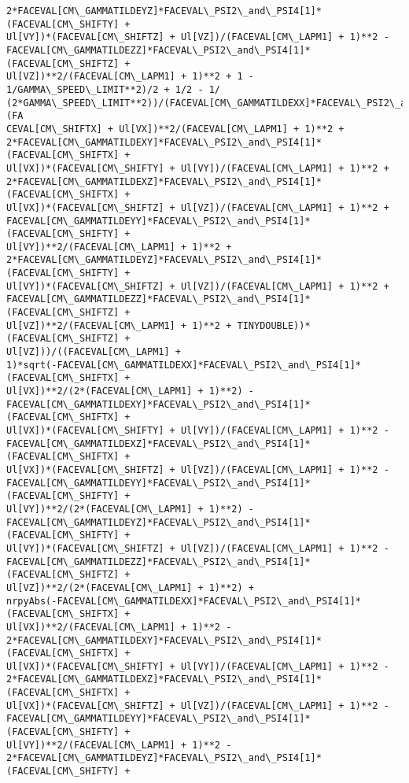 \documentclass[landscape,letterpaper,10pt,english]{article}
\begin{document}
\begin{Verbatim}[commandchars=\\\{\}]
2*FACEVAL[CM\_GAMMATILDEYZ]*FACEVAL\_PSI2\_and\_PSI4[1]*(FACEVAL[CM\_SHIFTY] +
Ul[VY])*(FACEVAL[CM\_SHIFTZ] + Ul[VZ])/(FACEVAL[CM\_LAPM1] + 1)**2 -
FACEVAL[CM\_GAMMATILDEZZ]*FACEVAL\_PSI2\_and\_PSI4[1]*(FACEVAL[CM\_SHIFTZ] +
Ul[VZ])**2/(FACEVAL[CM\_LAPM1] + 1)**2 + 1 - 1/GAMMA\_SPEED\_LIMIT**2)/2 + 1/2 - 1/
(2*GAMMA\_SPEED\_LIMIT**2))/(FACEVAL[CM\_GAMMATILDEXX]*FACEVAL\_PSI2\_and\_PSI4[1]*(FA
CEVAL[CM\_SHIFTX] + Ul[VX])**2/(FACEVAL[CM\_LAPM1] + 1)**2 +
2*FACEVAL[CM\_GAMMATILDEXY]*FACEVAL\_PSI2\_and\_PSI4[1]*(FACEVAL[CM\_SHIFTX] +
Ul[VX])*(FACEVAL[CM\_SHIFTY] + Ul[VY])/(FACEVAL[CM\_LAPM1] + 1)**2 +
2*FACEVAL[CM\_GAMMATILDEXZ]*FACEVAL\_PSI2\_and\_PSI4[1]*(FACEVAL[CM\_SHIFTX] +
Ul[VX])*(FACEVAL[CM\_SHIFTZ] + Ul[VZ])/(FACEVAL[CM\_LAPM1] + 1)**2 +
FACEVAL[CM\_GAMMATILDEYY]*FACEVAL\_PSI2\_and\_PSI4[1]*(FACEVAL[CM\_SHIFTY] +
Ul[VY])**2/(FACEVAL[CM\_LAPM1] + 1)**2 +
2*FACEVAL[CM\_GAMMATILDEYZ]*FACEVAL\_PSI2\_and\_PSI4[1]*(FACEVAL[CM\_SHIFTY] +
Ul[VY])*(FACEVAL[CM\_SHIFTZ] + Ul[VZ])/(FACEVAL[CM\_LAPM1] + 1)**2 +
FACEVAL[CM\_GAMMATILDEZZ]*FACEVAL\_PSI2\_and\_PSI4[1]*(FACEVAL[CM\_SHIFTZ] +
Ul[VZ])**2/(FACEVAL[CM\_LAPM1] + 1)**2 + TINYDOUBLE))*(FACEVAL[CM\_SHIFTZ] +
Ul[VZ]))/((FACEVAL[CM\_LAPM1] +
1)*sqrt(-FACEVAL[CM\_GAMMATILDEXX]*FACEVAL\_PSI2\_and\_PSI4[1]*(FACEVAL[CM\_SHIFTX] +
Ul[VX])**2/(2*(FACEVAL[CM\_LAPM1] + 1)**2) -
FACEVAL[CM\_GAMMATILDEXY]*FACEVAL\_PSI2\_and\_PSI4[1]*(FACEVAL[CM\_SHIFTX] +
Ul[VX])*(FACEVAL[CM\_SHIFTY] + Ul[VY])/(FACEVAL[CM\_LAPM1] + 1)**2 -
FACEVAL[CM\_GAMMATILDEXZ]*FACEVAL\_PSI2\_and\_PSI4[1]*(FACEVAL[CM\_SHIFTX] +
Ul[VX])*(FACEVAL[CM\_SHIFTZ] + Ul[VZ])/(FACEVAL[CM\_LAPM1] + 1)**2 -
FACEVAL[CM\_GAMMATILDEYY]*FACEVAL\_PSI2\_and\_PSI4[1]*(FACEVAL[CM\_SHIFTY] +
Ul[VY])**2/(2*(FACEVAL[CM\_LAPM1] + 1)**2) -
FACEVAL[CM\_GAMMATILDEYZ]*FACEVAL\_PSI2\_and\_PSI4[1]*(FACEVAL[CM\_SHIFTY] +
Ul[VY])*(FACEVAL[CM\_SHIFTZ] + Ul[VZ])/(FACEVAL[CM\_LAPM1] + 1)**2 -
FACEVAL[CM\_GAMMATILDEZZ]*FACEVAL\_PSI2\_and\_PSI4[1]*(FACEVAL[CM\_SHIFTZ] +
Ul[VZ])**2/(2*(FACEVAL[CM\_LAPM1] + 1)**2) +
nrpyAbs(-FACEVAL[CM\_GAMMATILDEXX]*FACEVAL\_PSI2\_and\_PSI4[1]*(FACEVAL[CM\_SHIFTX] +
Ul[VX])**2/(FACEVAL[CM\_LAPM1] + 1)**2 -
2*FACEVAL[CM\_GAMMATILDEXY]*FACEVAL\_PSI2\_and\_PSI4[1]*(FACEVAL[CM\_SHIFTX] +
Ul[VX])*(FACEVAL[CM\_SHIFTY] + Ul[VY])/(FACEVAL[CM\_LAPM1] + 1)**2 -
2*FACEVAL[CM\_GAMMATILDEXZ]*FACEVAL\_PSI2\_and\_PSI4[1]*(FACEVAL[CM\_SHIFTX] +
Ul[VX])*(FACEVAL[CM\_SHIFTZ] + Ul[VZ])/(FACEVAL[CM\_LAPM1] + 1)**2 -
FACEVAL[CM\_GAMMATILDEYY]*FACEVAL\_PSI2\_and\_PSI4[1]*(FACEVAL[CM\_SHIFTY] +
Ul[VY])**2/(FACEVAL[CM\_LAPM1] + 1)**2 -
2*FACEVAL[CM\_GAMMATILDEYZ]*FACEVAL\_PSI2\_and\_PSI4[1]*(FACEVAL[CM\_SHIFTY] +

\end{Verbatim}
\end{document}

